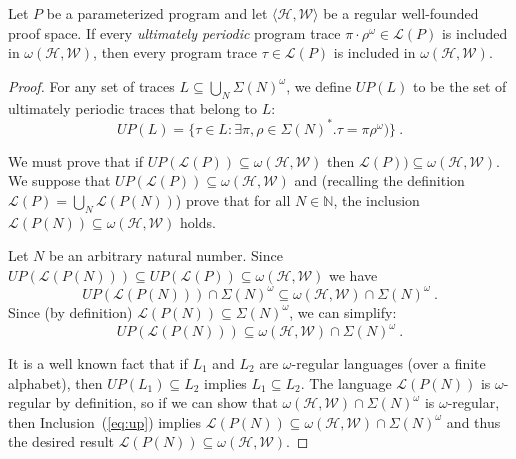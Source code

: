 \documentclass[9pt,nocopyrightspace]{sigplanconf}
\theoremstyle{definition}
\newcommand{\tuple}[1]{\langle #1 \rangle}
\newcommand{\rankformulas}{\mathscr{W}}
\newcommand{\lang}{\mathcal{L}}
\newcommand{\iSigma}[1]{\Sigma(#1)}
\newcommand{\UP}{\textit{UP}}
\begin{document}
\begin{theorem} \label{thm:up}
  Let $P$ be a parameterized program and let
  $\tuple{\mathscr{H},\rankformulas}$ be a regular well-founded proof space.  If
  every \emph{ultimately periodic}
  program trace $\pi \cdot\rho^\omega \in \lang(P)$ is included in
  $\omega(\mathscr{H},\rankformulas)$, then every program trace $\tau \in \lang(P)$ is included in
  $\omega(\mathscr{H},\rankformulas)$.
\end{theorem}
\begin{proof}
  For any set of traces $L \subseteq \bigcup_N\iSigma{N}^\omega$, we define
  $\UP(L)$ to be the set of ultimately periodic traces that belong to $L$:
\[ \UP(L) = \{ \tau \in L : \exists \pi,\rho \in \iSigma{N}^*. \tau = \pi  \rho^\omega) \}\ . \]

   We must prove that if $\UP(\lang(P)) \subseteq \omega(\mathscr{H},\rankformulas)$ then $\lang(P)) \subseteq \omega(\mathscr{H},\rankformulas)$.  We suppose that $\UP(\lang(P)) \subseteq \omega(\mathscr{H},\rankformulas)$ and (recalling the definition $\lang(P) = \bigcup_N \lang(P(N))$) prove that for all $N \in \mathbb{N}$, the inclusion $\lang(P(N)) \subseteq \omega(\mathscr{H},\rankformulas)$ holds.

   Let $N$ be an arbitrary natural number.
   Since $\UP(\lang(P(N))) \subseteq \UP(\lang(P)) \subseteq \omega(\mathscr{H},\rankformulas)$ we have
   \[ \UP(\lang(P(N))) \cap \Sigma(N)^\omega \subseteq \omega(\mathscr{H},\rankformulas) \cap \Sigma(N)^\omega\ .\]
   Since (by
  definition) $\lang(P(N)) \subseteq \Sigma(N)^\omega$, we can simplify:
  \begin{equation}
    \UP(\lang(P(N))) \subseteq \omega(\mathscr{H},\rankformulas) \cap \Sigma(N)^\omega\ .
    \label{eq:up}
  \end{equation}

  It is a well known fact that if $L_1$ and $L_2$ are $\omega$-regular
  languages (over a finite alphabet), then $\UP(L_1) \subseteq L_2$
  implies $L_1 \subseteq L_2$.  The language $\lang(P(N))$ is $\omega$-regular
  by definition, so if we can show that $\omega(\mathscr{H},\rankformulas) \cap
  \iSigma{N}^\omega$ is $\omega$-regular, then Inclusion~(\ref{eq:up})
  implies $\lang(P(N)) \subseteq \omega(\mathscr{H},\rankformulas) \cap \Sigma(N)^\omega$ and thus the desired result $\lang(P(N)) \subseteq
  \omega(\mathscr{H},\rankformulas)$.
 

\end{proof}
\end{document}
